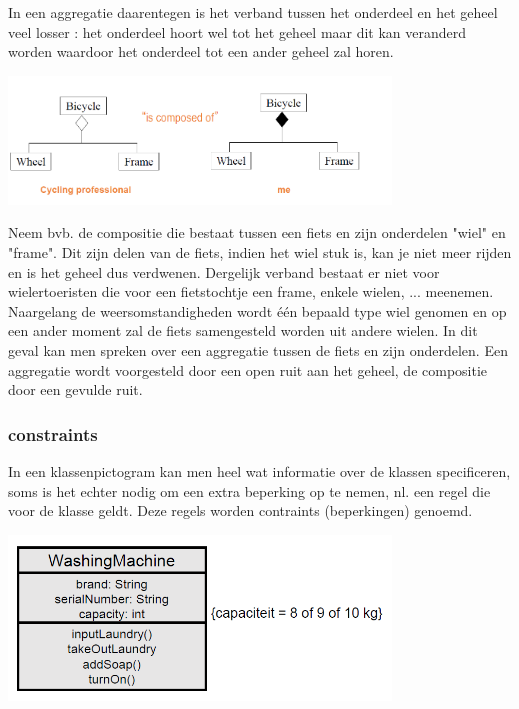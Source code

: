 In een aggregatie daarentegen is het verband tussen het onderdeel en het
geheel veel losser : het onderdeel hoort wel tot het geheel maar dit kan veranderd worden waardoor het onderdeel tot een ander geheel zal horen.


\begin{center}
\includegraphics[width=4in]{img/aggcom}%
\end{center}

Neem bvb. de compositie die bestaat tussen een fiets en zijn onderdelen "wiel" en "frame". Dit zijn delen van de fiets, indien het wiel stuk is, kan je niet meer rijden en is het geheel dus verdwenen.
Dergelijk verband bestaat er niet voor wielertoeristen die voor een fietstochtje een frame, enkele wielen, ... meenemen. Naargelang de weersomstandigheden wordt één bepaald type wiel genomen en op een ander moment zal de fiets samengesteld worden uit andere wielen. In dit geval kan men spreken over een aggregatie tussen de fiets en zijn onderdelen.
Een aggregatie wordt voorgesteld door een open ruit aan het geheel, de compositie door een gevulde ruit.

\subsubsection{constraints}

In een klassenpictogram kan men heel wat informatie over de klassen specificeren, soms is het echter nodig om een extra beperking op te nemen, nl. een regel die voor de klasse geldt. Deze regels worden contraints (beperkingen) genoemd.


\begin{center}
\includegraphics[width=4in]{img/const1}%
\end{center}

